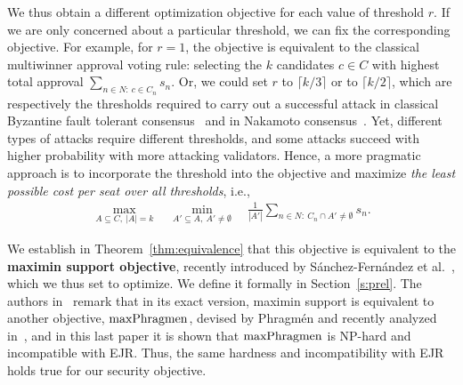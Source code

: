 We thus obtain a different optimization objective for each value of threshold $r$. 
If we are only concerned about a particular threshold, we can fix the corresponding objective. 
For example, for $r=1$, the objective is equivalent to the classical multiwinner approval voting rule: selecting the $k$ candidates $c\in C$ with highest total approval $\sum_{n\in N: \ c\in C_n} s_n$. 
Or, we could set $r$ to $\lceil k/3\rceil$ or to $\lceil k/2\rceil$, which are respectively the thresholds required to carry out a successful attack in classical Byzantine fault tolerant consensus~\cite{pease1980reaching} and in Nakamoto consensus~\cite{stifter2018agreement}. 
Yet, different types of attacks require different thresholds, and some attacks succeed with higher probability with more attacking validators. Hence, a more pragmatic approach is to incorporate the threshold into the objective and maximize \emph{the least possible cost per seat over all thresholds}, i.e.,  
\begin{align}\label{eq:security}
    \max_{A\subseteq C, \ |A|=k} \quad \min_{A'\subseteq A, \ A'\neq \emptyset} \quad \frac{1}{|A'|} \sum_{n\in N: \ C_n\cap A' \neq \emptyset} s_n.
\end{align}

We establish in Theorem~\ref{thm:equivalence} that this objective is equivalent to the \textbf{maximin support objective}, recently introduced by Sánchez-Fernández et al.~\cite{sanchez2016maximin}, which we thus set to optimize. 
We define it formally in Section~\ref{s:prel}.
The authors in~\cite{sanchez2016maximin} remark that in its exact version, maximin support is equivalent to another objective, $\operatorname{maxPhragmen}$, devised by Phragm\'{e}n and recently analyzed in~\cite{brill2017phragmen}, and in this last paper it is shown that $\operatorname{maxPhragmen}$ is NP-hard and incompatible with EJR. 
Thus, the same hardness and incompatibility with EJR holds true for our security objective. 

